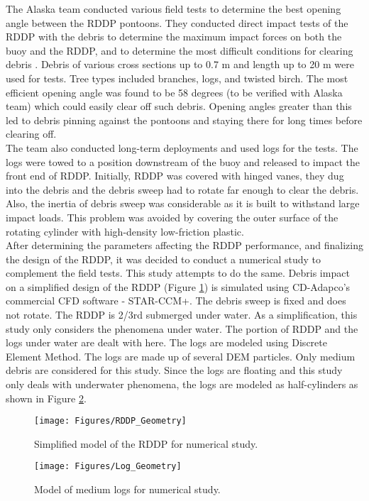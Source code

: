 The Alaska team conducted various field tests to determine the best opening angle between the RDDP pontoons. They conducted direct impact tests of the RDDP with the debris to determine the maximum impact forces on both the buoy and the RDDP, and to determine the most difficult conditions for clearing debris \cite{Reference7}. Debris of various cross sections up to 0.7 m and length up to 20 m were used for tests. Tree types included branches, logs, and twisted birch. The most efficient opening angle was found to be 58 degrees (to be verified with Alaska team) which could easily clear off such debris. Opening angles greater than this led to debris pinning against the pontoons and staying there for long times before clearing off.\\
The team also conducted long-term deployments and used logs for the tests. The logs were towed to a position downstream of the buoy and released to impact the front end of RDDP. Initially, RDDP was covered with hinged vanes, they dug into the debris and the debris sweep had to rotate far enough to clear the debris. Also, the inertia of debris sweep was considerable as it is built to withstand large impact loads. This problem was avoided by covering the outer surface of the rotating cylinder with high-density low-friction plastic.\\
After determining the parameters affecting the RDDP performance, and finalizing the design of the RDDP, it was decided to conduct a numerical study to complement the field tests. This study attempts to do the same. Debris impact on a simplified design of the RDDP (Figure \ref{fig:RDDP_Geometry}) is simulated using CD-Adapco's commercial CFD software - STAR-CCM+. The debris sweep is fixed and does not rotate. The RDDP is 2/3rd submerged under water. As a simplification, this study only considers the phenomena under water.  The portion of RDDP and the logs under water are dealt with here. The logs are modeled using Discrete Element Method. The logs are made up of several DEM particles. Only medium debris are considered for this study. Since the logs are floating and this study only deals with underwater phenomena, the logs are modeled as half-cylinders as shown in Figure \ref{fig:Log_Geometry}.
\begin{figure}
\centering
\texttt{[image: Figures/RDDP\_Geometry]}
\caption{\label{fig:RDDP_Geometry}Simplified model of the RDDP for numerical study.}
\end{figure}
\begin{figure}
\centering
\texttt{[image: Figures/Log\_Geometry]}
\caption{\label{fig:Log_Geometry}Model of medium logs for numerical study.}
\end{figure}













